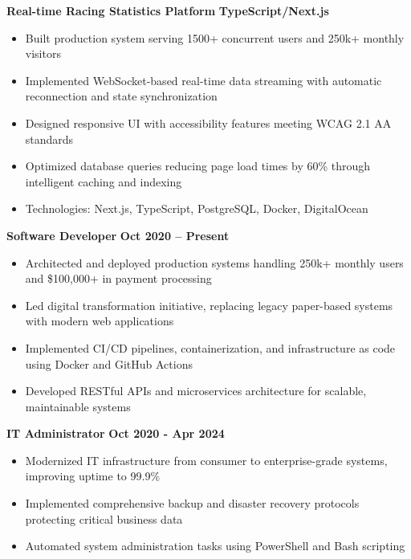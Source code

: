 \documentclass{article}
\begin{document}
\textbf{Real-time Racing Statistics Platform} \hfill \textbf{TypeScript/Next.js}
\begin{itemize}[noitemsep,topsep=2pt]
    \item Built production system serving 1500+ concurrent users and 250k+ monthly visitors
    \item Implemented WebSocket-based real-time data streaming with automatic reconnection and state synchronization
    \item Designed responsive UI with accessibility features meeting WCAG 2.1 AA standards
    \item Optimized database queries reducing page load times by 60\% through intelligent caching and indexing
    \item Technologies: Next.js, TypeScript, PostgreSQL, Docker, DigitalOcean
\end{itemize}


 \hfill {}

\textbf{Software Developer} \hfill \textbf{Oct 2020 – Present}
\begin{itemize}[noitemsep,topsep=2pt]
    \item Architected and deployed production systems handling 250k+ monthly users and \$100,000+ in payment processing
    \item Led digital transformation initiative, replacing legacy paper-based systems with modern web applications
    \item Implemented CI/CD pipelines, containerization, and infrastructure as code using Docker and GitHub Actions
    \item Developed RESTful APIs and microservices architecture for scalable, maintainable systems
\end{itemize}

\textbf{IT Administrator} \hfill \textbf{Oct 2020 - Apr 2024}
\begin{itemize}[noitemsep,topsep=2pt]
    \item Modernized IT infrastructure from consumer to enterprise-grade systems, improving uptime to 99.9\%
    \item Implemented comprehensive backup and disaster recovery protocols protecting critical business data
    \item Automated system administration tasks using PowerShell and Bash scripting
\end{itemize}
\end{document}
